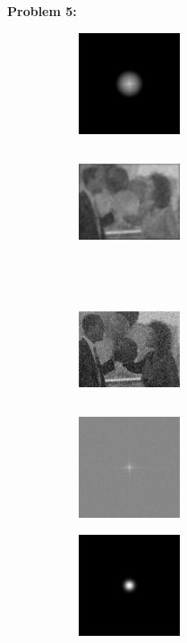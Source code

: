 \documentclass[11pt]{article}
\newenvironment{problem}[1]{\textbf{Problem #1: }}{\newpage}
\begin{document}
\begin{problem}{5}
\begin{enumerate}[label = (\alph*)]
\begin{figure}[h!]
				\begin{subfigure}[h!]{.18\textwidth}
					\centering
					\includegraphics[height = 3cm, width = 3cm]{Figures/Prob5/Red/6}
					\caption{}
				\end{subfigure}
				\begin{subfigure}[h!]{.18\textwidth}
					\centering
					\includegraphics[height = 3cm, width = 3cm]{Figures/Prob5/Red/8}
					\caption{}
				\end{subfigure}
			\end{figure}
			\\ 
			\begin{figure}[h!]
				\centering
				\begin{subfigure}[h!]{.18\textwidth}
					\centering
					\includegraphics[height = 3cm, width = 3cm]{Figures/Prob5/Green/1}
					\caption{}
				\end{subfigure}
				\begin{subfigure}[h!]{.18\textwidth}
					\centering
					\includegraphics[height = 3cm, width = 3cm]{Figures/Prob5/Green/4}
					\caption{}
				\end{subfigure}
				\begin{subfigure}[h!]{.18\textwidth}
					\centering
					\includegraphics[height = 3cm, width = 3cm]{Figures/Prob5/Green/5}

\end{subfigure}
\end{figure}
\end{enumerate}
\end{problem}
\end{document}

